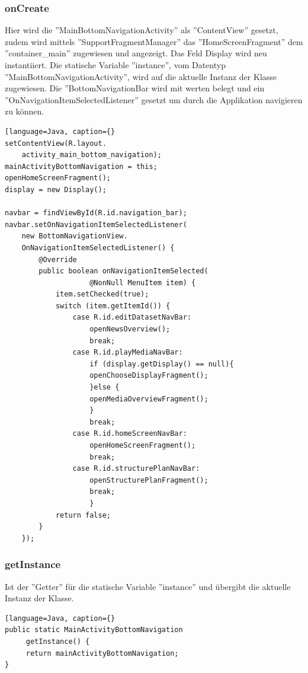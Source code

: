 \subsubsection{onCreate}
Hier wird die ''MainBottomNavigationActivity'' als ''ContentView'' gesetzt, zudem wird mittels ''SupportFragmentManager'' das ''HomeScreenFragment'' dem ''container\_main'' zugewiesen und angezeigt. Das Feld Display wird neu instantiiert. Die statische Variable ''instance'', vom Datentyp ''MainBottomNavigationActivity'', wird auf die aktuelle Instanz der Klasse zugewiesen. Die ''BottomNavigationBar wird mit werten belegt und ein ''OnNavigationItemSelectedListener'' gesetzt um durch die Applikation navigieren zu können.
\begin{lstlisting}[language=Java, caption={}
setContentView(R.layout.
	activity_main_bottom_navigation);
mainActivityBottomNavigation = this;
openHomeScreenFragment();
display = new Display();
 
navbar = findViewById(R.id.navigation_bar);
navbar.setOnNavigationItemSelectedListener(
	new BottomNavigationView.
   	OnNavigationItemSelectedListener() {
    	@Override
     	public boolean onNavigationItemSelected(
     				@NonNull MenuItem item) {
     		item.setChecked(true);
        	switch (item.getItemId()) {
        		case R.id.editDatasetNavBar:
            		openNewsOverview();
                	break;
            	case R.id.playMediaNavBar:
                	if (display.getDisplay() == null){
                	openChooseDisplayFragment();
                	}else {
                	openMediaOverviewFragment();
                	}
                	break;
            	case R.id.homeScreenNavBar:
                	openHomeScreenFragment();
                	break;
            	case R.id.structurePlanNavBar:
                	openStructurePlanFragment();
                	break;
                	}
          	return false;
        }
	});
\end{lstlisting}	
\subsubsection{getInstance}
 Ist der ''Getter'' für die statische Variable ''instance'' und übergibt die aktuelle Instanz der Klasse.
\begin{lstlisting}[language=Java, caption={}
public static MainActivityBottomNavigation
	 getInstance() {
     return mainActivityBottomNavigation;
}
\end{lstlisting}
